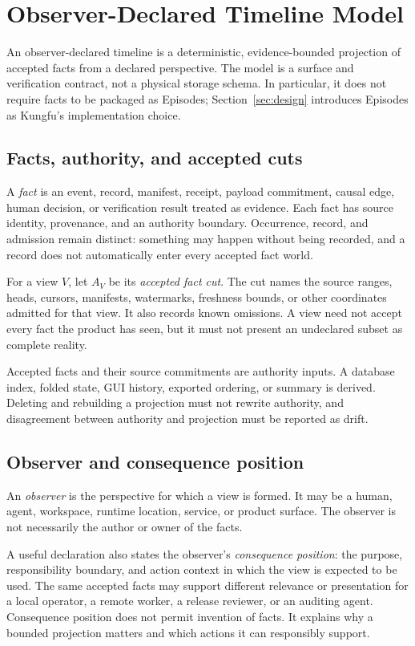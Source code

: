 \section{Observer-Declared Timeline Model}
\label{sec:model}

An observer-declared timeline is a deterministic, evidence-bounded projection
of accepted facts from a declared perspective. The model is a surface and
verification contract, not a physical storage schema. In particular, it does
not require facts to be packaged as Episodes; Section~\ref{sec:design}
introduces Episodes as Kungfu's implementation choice.

\subsection{Facts, authority, and accepted cuts}

A \emph{fact} is an event, record, manifest, receipt, payload commitment,
causal edge, human decision, or verification result treated as evidence. Each
fact has source identity, provenance, and an authority boundary. Occurrence,
record, and admission remain distinct: something may happen without being
recorded, and a record does not automatically enter every accepted fact world.

For a view $V$, let $A_V$ be its \emph{accepted fact cut}. The cut names the
source ranges, heads, cursors, manifests, watermarks, freshness bounds, or other
coordinates admitted for that view. It also records known omissions. A view
need not accept every fact the product has seen, but it must not present an
undeclared subset as complete reality.

Accepted facts and their source commitments are authority inputs. A database
index, folded state, GUI history, exported ordering, or summary is derived.
Deleting and rebuilding a projection must not rewrite authority, and
disagreement between authority and projection must be reported as drift.

\subsection{Observer and consequence position}

An \emph{observer} is the perspective for which a view is formed. It may be a
human, agent, workspace, runtime location, service, or product surface. The
observer is not necessarily the author or owner of the facts.

A useful declaration also states the observer's \emph{consequence position}:
the purpose, responsibility boundary, and action context in which the view is
expected to be used. The same accepted facts may support different relevance
or presentation for a local operator, a remote worker, a release reviewer, or
an auditing agent. Consequence position does not permit invention of facts. It
explains why a bounded projection matters and which actions it can responsibly
support.

